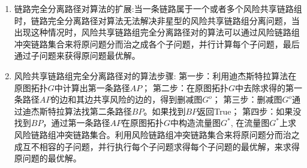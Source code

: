 \begin{enumerate}
    \item 链路完全分离路径对算法的扩展:当一条链路属于一个或者多个风险共享链路组时，链路完全分离路径对算法无法解决非星型的风险共享链路组分离问题，当出现这种情况时，风险共享链路组完全分离路径对的算法可以通过风险链路组冲突链路集合来将原问题分而治之成各个子问题，并行计算每个子问题，最后通过子问题来获得原问题最优解。
    \item 风险共享链路组完全分离路径对的算法步骤:\newline
    第一步：利用迪杰斯特拉算法在原图拓扑$G$中计算出第一条路径$AP$；\newline
    第二步：在原图拓扑$G$中去除求得的第一条路径$AP$的边和其边共享风险的边的，得到删减图$G^o$；\newline
    第三步：删减图$G^o$通过迪杰斯特拉算法找第二条路径$BP$。如果找到$BP$返回True；\newline
    第四步：如果没找到$BP$，通过第一条路径$AP$在原图拓扑$G$中构造流量图$G^*$, 在流量图$G^*$上求风险链路组冲突链路集合。利用风险链路组冲突链路集合来将原问题分而治之成互不相容的子问题，并行执行每个子问题求得每个子问题的最优解，来求得原问题的最优解。\newline
\end{enumerate}